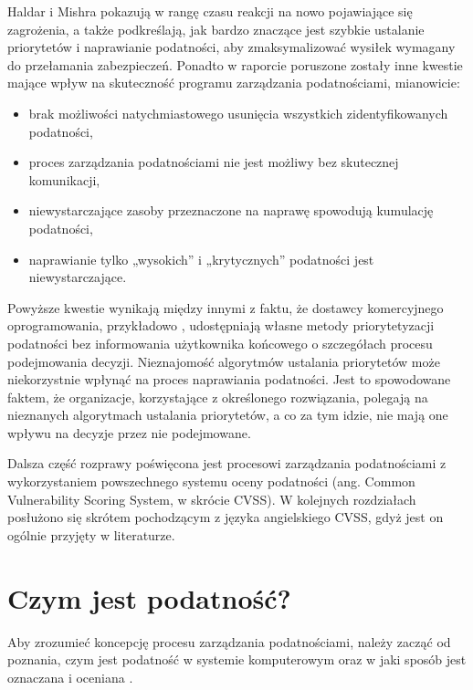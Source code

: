 \bigbreak
Haldar i Mishra pokazują w \cite{haldar2017mathematical} rangę czasu reakcji na nowo pojawiające się zagrożenia, a także podkreślają, jak bardzo znaczące jest szybkie ustalanie priorytetów i naprawianie podatności, aby zmaksymalizować wysiłek wymagany do przełamania zabezpieczeń. Ponadto w raporcie \cite{Gartner-2020} poruszone zostały inne kwestie mające wpływ na skuteczność programu zarządzania podatnościami, mianowicie:
\begin{itemize}
    \item brak możliwości natychmiastowego usunięcia wszystkich zidentyfikowanych podatności,
    \item proces zarządzania podatnościami nie jest możliwy bez skutecznej komunikacji,
    \item niewystarczające zasoby przeznaczone na naprawę spowodują kumulację podatności,
    \item naprawianie tylko „wysokich” i „krytycznych” podatności jest niewystarczające.
\end{itemize}

\bigbreak
Powyższe kwestie wynikają między innymi z faktu, że dostawcy komercyjnego oprogramowania, przykładowo \cite{beale2004nessus, fsecure2021, qualys2021, ibmxforce}, udostępniają własne metody priorytetyzacji podatności bez informowania użytkownika końcowego o szczegółach procesu podejmowania decyzji. Nieznajomość algorytmów ustalania priorytetów może niekorzystnie wpłynąć na proces naprawiania podatności. Jest to spowodowane faktem, że organizacje, korzystające z określonego rozwiązania, polegają na nieznanych algorytmach ustalania priorytetów, a co za tym idzie, nie mają one wpływu na decyzje przez nie podejmowane.

\bigbreak
Dalsza część rozprawy poświęcona jest procesowi zarządzania podatnościami z wykorzystaniem powszechnego systemu oceny podatności (ang. Common Vulnerability Scoring System, w skrócie CVSS). W kolejnych rozdziałach posłużono się skrótem pochodzącym z języka angielskiego CVSS, gdyż jest on ogólnie przyjęty w literaturze.

\section{Czym jest podatność?}
Aby zrozumieć koncepcję procesu zarządzania podatnościami, należy zacząć od poznania, czym jest podatność w systemie komputerowym oraz w jaki sposób jest oznaczana \cite{mann1999towards} i oceniana \cite{cvsspecification}.

